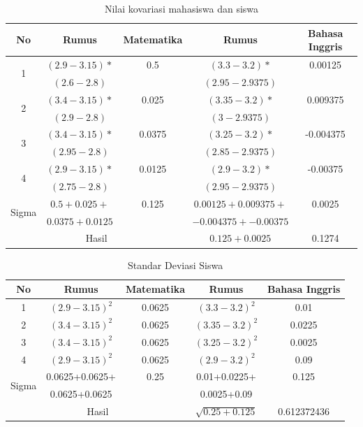 \begin{enumerate}
    \begin{table}[H]
        \centering
        \renewcommand{\arraystretch}{1.5}
        \begin{tabular}{|c|c|c|c|c|}
            \hline
            No & Rumus & Matematika & Rumus & Bahasa Inggris \\
            \hline
            \multirow{2}{*}{1} & $(2.9-3.15)*$ & 0.5    & $(3.3-3.2)*$ & 0.00125\\
            & $(2.6-2.8)$ & & $(2.95-2.9375)$ &  \\
            \hline
            \multirow{2}{*}{2} & $(3.4-3.15)*$ & 0.025  & $(3.35-3.2)*$ & 0.009375 \\
            & $(2.9-2.8)$ & & $(3-2.9375)$ &  \\
            \hline
            \multirow{2}{*}{3} & $(3.4-3.15)*$ & 0.0375 & $(3.25-3.2)*$ & -0.004375 \\
            & $(2.95-2.8)$ &  & $(2.85-2.9375)$ &  \\
            \hline
            \multirow{2}{*}{4} & $(2.9-3.15)*$ & 0.0125 & $(2.9-3.2)*$ & -0.00375 \\
            & $(2.75-2.8)$ &  & $(2.95-2.9375)$ &  \\
            \hline
            \multirow{2}{*}{Sigma} & $0.5 + 0.025 +$ & 0.125 & $0.00125 + 0.009375 +$ & 0.0025 \\
            & $0.0375 + 0.0125$ & & $-0.004375 + -0.00375$ &  \\
            \hline
            \multicolumn{3}{|c|}{Hasil} & $0.125+0.0025$ & 0.1274 \\
            \hline
        \end{tabular}
        \caption{Nilai kovariasi mahasiswa dan siswa}
        \label{tab:kovariasi}
    \end{table}
    
    \begin{table}[H]
        \centering
        \renewcommand{\arraystretch}{1.5}
        \begin{tabular}{|c|c|c|c|c|}
    		\hline
    		No & Rumus & Matematika & Rumus & Bahasa Inggris\\
    		\hline
    		1 & $(2.9-3.15)^2$ & 0.0625 & $(3.3-3.2)^2$ & 0.01 \\
    		\hline
    		2 & $(3.4-3.15)^2$ & 0.0625 & $(3.35-3.2)^2$ & 0.0225 \\
    		\hline
    		3 & $(3.4-3.15)^2$ & 0.0625 & $(3.25-3.2)^2$ & 0.0025 \\
    		\hline
    		4 & $(2.9-3.15)^2$ & 0.0625 & $(2.9-3.2)^2$ & 0.09 \\
    		\hline
    		\multirow{2}{*}{Sigma} & 0.0625+0.0625+ & 0.25 & 0.01+0.0225+ & 0.125\\
    		& 0.0625+0.0625 & & 0.0025+0.09 & \\
    		\hline
    		\multicolumn{3}{|c|}{Hasil} & $\sqrt{0.25+0.125}$ & 0.612372436 \\
    		\hline
        \end{tabular}
        \caption{Standar Deviasi Siswa}
    	\label{tab:sd_siswa}
    \end{table}
    

\end{enumerate}
